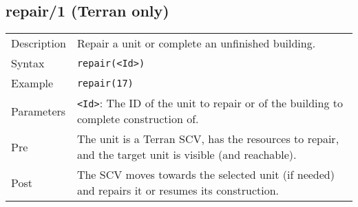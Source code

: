 \subsection{repair/1 (Terran only)}
\begin{tabularx}{\textwidth}{lX}
 Description & Repair a unit or complete an unfinished building. \\
 Syntax & \verb|repair(<Id>)| \\
 Example & \verb|repair(17)| \\
 Parameters & \verb|<Id>|: The ID of the unit to repair or of the building to complete construction of. \\
 Pre & The unit is a Terran SCV, has the resources to repair, and the target unit is visible (and reachable). \\
 Post & The SCV moves towards the selected unit (if needed) and repairs it or resumes its construction.
\end{tabularx}